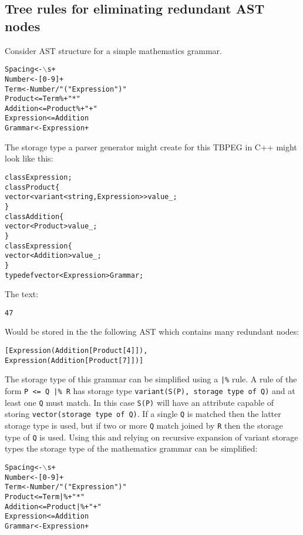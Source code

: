 \documentclass[a4paper,11pt]{article}
\begin{document}
\subsection{Tree rules for eliminating redundant AST nodes}
Consider AST structure for a simple mathematics grammar.
\begin{alltt}
    Spacing    <- \(\backslash\)s+
    Number     <- [0-9]+
    Term       <- Number / "(" Expression ")"
    Product    <= Term \%+ "*"
    Addition   <= Product \%+ "+"
    Expression <= Addition
    Grammar    <- Expression+
\end{alltt}

The storage type a parser generator might create for this TBPEG in C++ might look like this:
\begin{alltt}
    class Expression;
    class Product \{
         vector< variant<string, Expression> > value\_;
    \}
    class Addition \{
         vector<Product> value\_;
    \}
    class Expression \{
        vector<Addition> value\_;
    \}
    typedef vector<Expression> Grammar;
\end{alltt}

The text:
\begin{alltt}
    4 7
\end{alltt}

Would be stored in the the following AST which contains many redundant nodes:
\begin{alltt}
    [ Expression(Addition[Product[4]]),
      Expression(Addition[Product[7]]) ]
\end{alltt}

The storage type of this grammar can be simplified using a \verb+|%+ rule.
A rule of the form \verb+P <= Q |% R+ has storage type \verb+variant(S(P), storage type of Q)+ and at least one \verb+Q+ must match.
In this case \verb+S(P)+ will have an attribute capable of storing \verb+vector(storage type of Q)+.
If a single \verb+Q+ is matched then the latter storage type is used, but if two or more \verb+Q+ match joined by \verb+R+ then the storage type of \verb+Q+ is used.
Using this and relying on recursive expansion of variant storage types the storage type of the mathematics grammar can be simplified:
\begin{alltt}
    Spacing    <- \(\backslash\)s+
    Number     <- [0-9]+
    Term       <- Number / "(" Expression ")"
    Product    <= Term |\%+ "*"
    Addition   <= Product |\%+ "+"
    Expression <= Addition
    Grammar    <- Expression+
\end{alltt}
\end{document}
